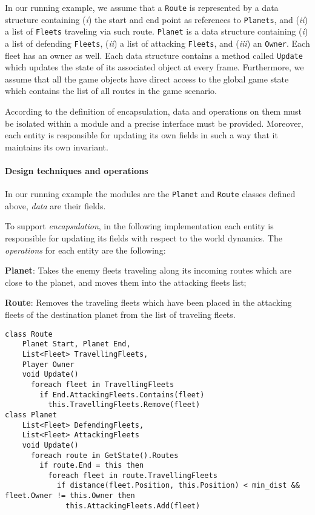 In our running example, we assume that a \texttt{Route} is represented by a data structure containing (\textit{i}) the start and end point as references to \texttt{Planets}, and (\textit{ii}) a list of \texttt{Fleets} traveling via such route. \texttt{Planet} is a data structure containing (\textit{i}) a list of defending \texttt{Fleets}, (\textit{ii}) a list of attacking \texttt{Fleets}, and (\textit{iii}) an \texttt{Owner}. Each fleet has an owner as well. Each data structure contains a method called \texttt{Update} which updates the state of its associated object at every frame. Furthermore, we assume that all the game objects have direct access to the global game state which contains the list of all routes in the game scenario.



According to the definition of encapsulation, data and operations on them must be isolated within a module and a precise interface must be provided. Moreover, each entity is responsible for updating its own fields in such a way that it maintains its own invariant.

\paragraph*{Design techniques and operations}

In our running example the modules are the \texttt{Planet} and \texttt{Route} classes defined above, \textit{data} are their fields.

To support \emph{encapsulation}, in the following implementation each entity is responsible for updating its fields with respect to the world dynamics. The \textit{operations} for each entity are the following:
\begin{inparaenum}[i)]
    \item \textbf{Planet}: Takes the enemy fleets traveling along its incoming routes which are close to the planet, and moves them into the attacking fleets list;
    \item \textbf{Route}: Removes the traveling fleets which have been placed in the attacking fleets of the destination planet from the list of traveling fleets.
\end{inparaenum}
\begin{lstlisting}
class Route
    Planet Start, Planet End,
    List<Fleet> TravellingFleets,
    Player Owner
    void Update()
      foreach fleet in TravellingFleets
        if End.AttackingFleets.Contains(fleet)
          this.TravellingFleets.Remove(fleet)
class Planet
    List<Fleet> DefendingFleets,
    List<Fleet> AttackingFleets
    void Update()
      foreach route in GetState().Routes
        if route.End = this then
          foreach fleet in route.TravellingFleets
            if distance(fleet.Position, this.Position) < min_dist && fleet.Owner != this.Owner then
              this.AttackingFleets.Add(fleet)
\end{lstlisting}


